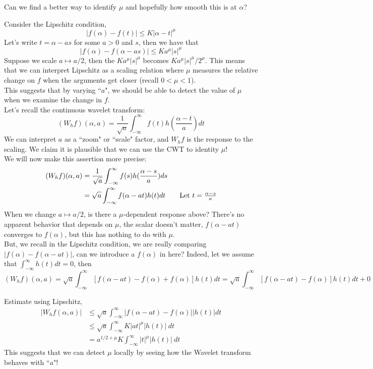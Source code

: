 \documentclass{article}
\begin{document}
\begin{question}
    Can we find a better way to identify $\mu$ and hopefully how smooth this is at $\alpha$?
\end{question}

Consider the Lipschitz condition, 
\[|f(\alpha) - f(t)| \leq K |\alpha - t|^\mu\]
Let's write $t = \alpha - as$ for some $a > 0$ and $s$, then we have that
\[|f(\alpha) - f(\alpha - as)| \leq K a^\mu |s|^\mu\]
Suppose we scale $a \mapsto a/2$, then the $K a^\mu |s|^\mu$ becomes $K a^\mu |s|^\mu/2^\mu$. This means that we can interpret Lipschitz as a scaling relation where $\mu$ measures the relative change on $f$ when the arguments get closer (recall $0 < \mu < 1$).\\

This suggests that by varying ``$a$", we should be able to detect the value of $\mu$ when we examine the change in $f$.\\

Let's recall the continuous wavelet transform:
\[(W_h f)(\alpha, a) = \frac{1}{\sqrt{a}} \int_{-\infty}^\infty f(t) h(\frac{\alpha - t}{a}) dt\]
We can interpret $a$ as a ``zoom" or ``scale" factor, and $W_h f$ is the response to the scaling. We claim it is plausible that we can use the CWT to identity $\mu$!\\

We will now make this assertion more precise:
\begin{align*}
    (W_h f)(\alpha, a) &= \frac{1}{\sqrt{a}} \int_{-\infty}^\infty f(s) h(\frac{\alpha - s}{a}) ds\\
    &= \sqrt{a} \int_{-\infty}^\infty f(\alpha - at) h(t) dt \tag*{Let $t = \frac{\alpha - s}{a}$}
\end{align*}
When we change $a \mapsto a/2$, is there a $\mu$-dependent response above? There's no apparent behavior that depends on $\mu$, the scalar doesn't matter, $f(\alpha - at)$ converges to $f(\alpha)$, but this has nothing to do with $\mu$.\\

But, we recall in the Lipschitz condition, we are really comparing $|f(\alpha) - f(\alpha - at)|$, can we introduce a $f(\alpha)$ in here? Indeed, let we assume that $\int_{-\infty}^\infty h(t) dt = 0$, then
\[(W_h f)(\alpha, a) = \sqrt{a} \int_{-\infty}^\infty [f(\alpha - at) - f(\alpha) + f(\alpha)] h(t) dt = \sqrt{a} \int_{-\infty}^\infty [f(\alpha - at) - f(\alpha)] h(t) dt + 0  \]

Estimate using Lipschitz, 
\begin{align*}
    |W_h f(\alpha, a)| &\leq \sqrt{a} \int_{-\infty}^\infty |f(\alpha - at) - f(\alpha)| |h(t)| dt\\
    &\leq \sqrt{a} \int_{-\infty}^\infty K|at|^\mu |h(t)|\ dt \tag*{Lipschitz Continuity}\\
    &= a^{1/2 + \mu} K \int_{-\infty}^\infty |t|^\mu |h(t)|\ dt
\end{align*}
This suggests that we can detect $\mu$ locally by seeing how the Wavelet transform behaves with ``$a$"!
\end{document}
